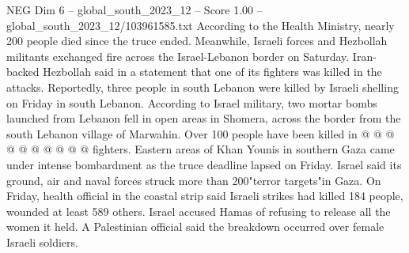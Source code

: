\begin{textsample}{NEG Dim 6 – global\_south\_2023\_12 – Score 1.00 – global\_south\_2023\_12/103961585.txt}
According to the Health Ministry, nearly 200 people died since the truce ended.
Meanwhile, Israeli forces and Hezbollah militants exchanged fire across the Israel-Lebanon border on Saturday.
Iran-backed Hezbollah said in a statement that one of its fighters was killed in the attacks.
Reportedly, three people in south Lebanon were killed by Israeli shelling on Friday in south Lebanon.
According to Israel military, two mortar bombs launched from Lebanon fell in open areas in Shomera, across the border from the south Lebanon village of Marwahin.
Over 100 people have been killed in @ @ @ @ @ @ @ @ @ @ fighters.
Eastern areas of Khan Younis in southern Gaza came under intense bombardment as the truce deadline lapsed on Friday.
Israel said its ground, air and naval forces struck more than 200"terror targets"in Gaza.
On Friday, health official in the coastal strip said Israeli strikes had killed 184 people, wounded at least 589 others.
Israel accused Hamas of refusing to release all the women it held.
A Palestinian official said the breakdown occurred over female Israeli soldiers.

\end{textsample}
